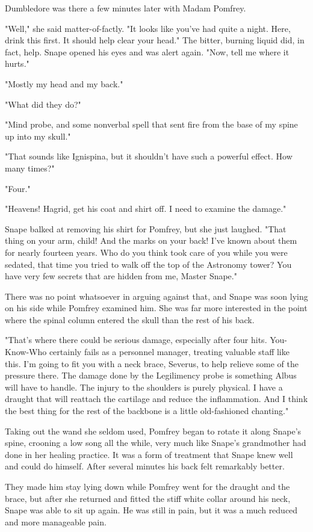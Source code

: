 Dumbledore was there a few minutes later with Madam Pomfrey.

"Well," she said matter-of-factly. "It looks like you've had quite a night. Here, drink this first. It should help clear your head." The bitter, burning liquid did, in fact, help. Snape opened his eyes and was alert again. "Now, tell me where it hurts."

"Mostly my head and my back."

"What did they do?"

"Mind probe, and some nonverbal spell that sent fire from the base of my spine up into my skull."

"That sounds like Ignispina, but it shouldn't have such a powerful effect. How many times?"

"Four."

"Heavens! Hagrid, get his coat and shirt off. I need to examine the damage."

Snape balked at removing his shirt for Pomfrey, but she just laughed. "That thing on your arm, child! And the marks on your back! I've known about them for nearly fourteen years. Who do you think took care of you while you were sedated, that time you tried to walk off the top of the Astronomy tower? You have very few secrets that are hidden from me, Master Snape."

There was no point whatsoever in arguing against that, and Snape was soon lying on his side while Pomfrey examined him. She was far more interested in the point where the spinal column entered the skull than the rest of his back.

"That's where there could be serious damage, especially after four hits. You-Know-Who certainly fails as a personnel manager, treating valuable staff like this. I'm going to fit you with a neck brace, Severus, to help relieve some of the pressure there. The damage done by the Legilimency probe is something Albus will have to handle. The injury to the shoulders is purely physical. I have a draught that will reattach the cartilage and reduce the inflammation. And I think the best thing for the rest of the backbone is a little old-fashioned chanting."

Taking out the wand she seldom used, Pomfrey began to rotate it along Snape's spine, crooning a low song all the while, very much like Snape's grandmother had done in her healing practice. It was a form of treatment that Snape knew well and could do himself. After several minutes his back felt remarkably better.

They made him stay lying down while Pomfrey went for the draught and the brace, but after she returned and fitted the stiff white collar around his neck, Snape was able to sit up again. He was still in pain, but it was a much reduced and more manageable pain.

